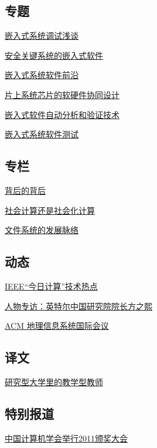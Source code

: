 \documentclass[a4paper]{article}
\begin{document}
\subsection{专题}
\href{http://history.ccf.org.cn/resources/1190201776262/2012/02/14/6.pdf}{嵌入式系统调试浅谈}

\href{http://history.ccf.org.cn/resources/1190201776262/2012/02/14/7.pdf}{安全关键系统的嵌入式软件}

\href{http://history.ccf.org.cn/resources/1190201776262/2012/02/14/2.pdf}{嵌入式系统软件前沿}

\href{http://history.ccf.org.cn/resources/1190201776262/2012/02/14/3.pdf}{片上系统芯片的软硬件协同设计}

\href{http://history.ccf.org.cn/resources/1190201776262/2012/02/14/4.pdf}{嵌入式软件自动分析和验证技术}

\href{http://history.ccf.org.cn/resources/1190201776262/2012/02/14/5.pdf}{嵌入式系统软件测试}

\subsection{专栏}
\href{http://history.ccf.org.cn/resources/1190201776262/2012/02/14/8.pdf}{背后的背后}

\href{http://history.ccf.org.cn/resources/1190201776262/2012/02/14/9.pdf}{社会计算还是社会化计算}

\href{http://history.ccf.org.cn/resources/1190201776262/2012/02/14/10.pdf}{文件系统的发展脉络}

\subsection{动态}
\href{http://history.ccf.org.cn/resources/1190201776262/2012/02/14/13.pdf}{IEEE“今日计算”技术热点}

\href{http://history.ccf.org.cn/resources/1190201776262/2012/02/14/11.pdf}{人物专访：英特尔中国研究院院长方之熙}

\href{http://history.ccf.org.cn/resources/1190201776262/2012/03/19/12.pdf}{ACM 地理信息系统国际会议}

\subsection{译文}
\href{http://history.ccf.org.cn/resources/1190201776262/2012/02/14/14.pdf}{研究型大学里的教学型教师}

\subsection{特别报道}
\href{http://history.ccf.org.cn/resources/1190201776262/2012/02/14/1.pdf}{中国计算机学会举行2011颁奖大会}
\end{document}
